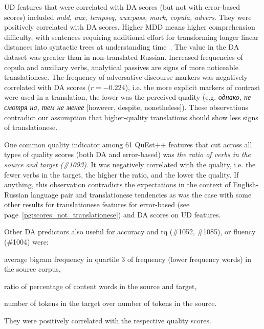 UD features that were correlated with DA scores (but not with error-based scores) included \textit{mdd, aux, tempseq, aux:pass, mark, copula, advers}. They were positively correlated with DA scores. Higher MDD means higher comprehension difficulty, with sentences requiring additional effort for transforming longer linear distances into syntactic trees at understanding time~\cite[p.162]{Jing2015}. The value in the DA dataset was greater than in non-translated Russian. Increased frequencies of copula and auxiliary verbs, analytical passives are signs of more noticeable translationese. The frequency of adversative discourse markers was negatively correlated with DA scores ($r=-0.224$), i.e. the more explicit markers of contrast were used in a translation, the lower was the perceived quality (e.g. \foreignlanguage{russian}{\textit{однако, несмотря на, тем не менее}} [however, despite, nonetheless]).
These observations contradict our assumption that higher-quality translations should show less signs of translationese. 

One common quality indicator among 61 QuEst++ features that cut across all types of quality scores (both DA and error-based) was \textit{the ratio of verbs in the source and target (\#1093)}. It was negatively correlated with the quality, i.e. the fewer verbs in the target, the higher the ratio, and the lower the quality. %
If anything, this observation contradicts the expectations in the context of English-Russian language pair and translationese tendencies as was the case with some other results for translationese features for error-based (see page~\ref{pg:scores_not_translationese}) and DA scores on UD features. 

Other DA predictors also useful for accuracy and tq (\#1052, \#1085), or fluency (\#1004) were: 
\begin{description}\compresslist{}
	\item[1052] average bigram frequency in quartile 3 of frequency (lower frequency words) in the source corpus,
	\item[1085] ratio of percentage of content words in the source and target,
	\item[1004] number of tokens in the target over number of tokens in the source.
\end{description}
They were positively correlated with the respective quality scores. 

